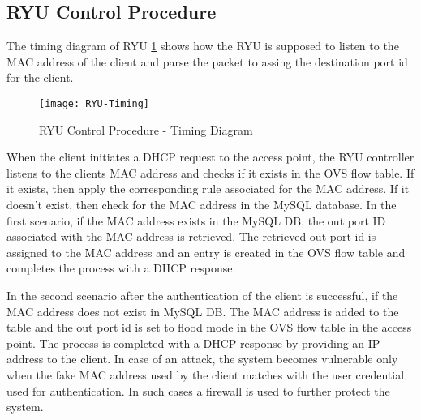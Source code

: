\subsection{RYU Control Procedure} \label{RYU Control Procedure}
The timing diagram of RYU \ref{fig:RYU-Timing} shows how the RYU is supposed to listen to the MAC address of the client and parse the packet to assing the destination port id for the client.

\begin{figure}
	\centering
	\texttt{[image: RYU-Timing]}
	\caption {RYU Control Procedure - Timing Diagram }
	\label{fig:RYU-Timing}
	\vspace{-10pt}
\end{figure}

When the client initiates a DHCP request to the access point, the RYU controller listens to the clients MAC address and checks if it exists in the OVS flow table. If it exists, then apply the corresponding rule associated for the MAC address. If it doesn’t exist, then check for the MAC address in the MySQL database. In the first scenario, if the MAC address exists in the MySQL DB, the out port ID associated with the MAC address is retrieved. The retrieved out port id is assigned to the MAC address and an entry is created in the OVS flow table and completes the process with a DHCP response.

In the second scenario after the authentication of the client is successful, if the MAC address does not exist in MySQL DB. The MAC address is added to the table and the out port id is set to flood mode in the OVS flow table in the access point. The process is completed with a DHCP response by providing an IP address to the client. In case of an attack, the system becomes vulnerable only when the fake MAC address used by the client matches with the user credential used for authentication. In such cases a firewall is used to further protect the system.

